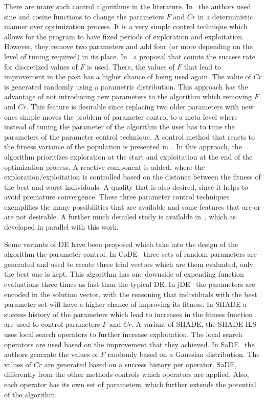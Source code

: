 There are many such control algorithms in the literature.
In~\cite{huang2013improved} the authors used sine and cosine functions
to change the parameters $F$ and $Cr$ in a deterministic manner
over optimization process. It is a very simple control technique
which allows for the program to have fixed periods of
exploration and exploitation. However, they remove two parameters
and add four (or more depending on the level of tuning required) in its place.
In~\cite{kovavcevic2014vns} a proposal that counts the success rate for discretized
values of $F$ is used. There, the values of $F$ that lead to improvement in the past
has a higher chance of being used again. The value of $Cr$ is generated randomly using
a parametric distribution. This approach has the advantage of
not introducing new parameters to the algorithm which removing $F$ and $Cr$.
This feature is desirable since replacing two older parameters with new ones
simple moves the problem of parameter control to a meta level where
instead of tuning the parameter of the algorithm the user has to tune
the parameters of the parameter control technique.
A control method that reacts to the fitness variance of the population
is presented in~\cite{ali2004population}. In this approach, the algorithm
prioritizes exploration at the start and exploitation at the end of the optimization
process. A reactive component is added, where the exploration/exploitation is controlled
based on the distance between the fitness of the best and worst individuals.
A quality that is also desired, since it helps to avoid premature convergence.
These three parameter control techniques exemplifies the many possibilities
that are available and some features that are or are not desirable. A further
much detailed study is available in~\cite{parpinelli18review},
which as developed in parallel with this work.

Some variants of \ac{DE} have been proposed which take into the design of the algorithm
the parameter control. In CoDE~\cite{wang2011differential} three sets of random parameters
are generated and used to create three trial vectors which are them evaluated, only
the best one is kept. This algorithm has one downside of expending function evaluations
three times as fast than the typical \ac{DE}. In jDE~\cite{brest2006self} the parameters
are encoded in the solution vector, with the reasoning that individuals with the best
parameter set will have a higher chance of improving its fitness.
In SHADE\cite{tanabe2013evaluating} a success history of the parameters
which lead to increases in the fitness function are used to control parameters $F$ and $Cr$. 
A variant of SHADE, the SHADE-ILS~\cite{molina2018shade} uses local search
operators to further increase exploitation. The local search operators are used based
on the improvement that they achieved. In \ac{SaDE}~\cite{qin2005self,qin2009differential}
the authors generate the values of $F$ randomly based on a Gaussian distribution.
The values of $Cr$ are generated based on a success history per operator. \ac{SaDE},
differently from the other methods controls which operators are applied. Also,
each operator has its own set of parameters, which further extends the
potential of the algorithm.

